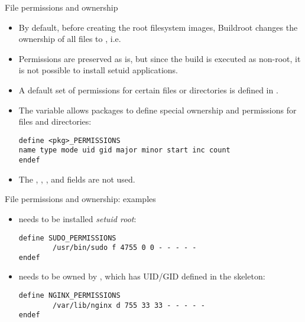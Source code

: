 \begin{frame}[fragile]{File permissions and ownership}

\begin{itemize}

\item By default, before creating the root filesystem images,
  Buildroot changes the ownership of all files to , i.e.
\item Permissions are preserved as is, but since the build is executed
  as non-root, it is not possible to install setuid applications.
\item A default set of permissions for certain files or directories is
  defined in .
\item The  variable allows packages to define
  special ownership and permissions for files and directories:
{\small
  \begin{block}{}
\begin{verbatim}
define <pkg>_PERMISSIONS
name type mode uid gid major minor start inc count
endef
\end{verbatim}
  \end{block}}
\item The , , ,  and
   fields are not used.

\end{itemize}

\end{frame}

\begin{frame}[fragile]{File permissions and ownership: examples}

  \begin{itemize}
  \item {} needs to be installed {\em setuid root}:
  \begin{block}{}
    \begin{verbatim}
define SUDO_PERMISSIONS
        /usr/bin/sudo f 4755 0 0 - - - - -
endef
\end{verbatim}
\end{block}

\item {} needs to be owned by ,
  which has UID/GID  defined in the skeleton:

\begin{block}{}
  \begin{verbatim}
define NGINX_PERMISSIONS
        /var/lib/nginx d 755 33 33 - - - - -
endef
\end{verbatim}
\end{block}

\end{itemize}

\end{frame}

